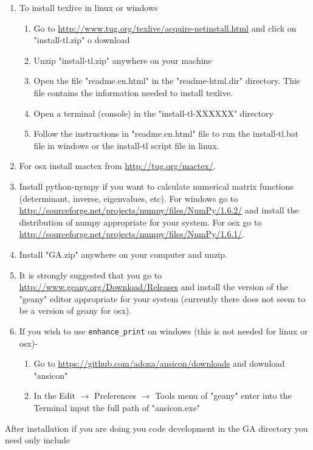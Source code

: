 \documentclass[10pt]{article}
\newcommand{\T}[1]{\texttt{#1}}
\begin{document}
\begin{enumerate}
    \item To install texlive in linux or windows
        \begin{enumerate}
        \item Go to \url{http://www.tug.org/texlive/acquire-netinstall.html} and click on "install-tl.zip" o download
        \item Unzip "install-tl.zip" anywhere on your machine
        \item Open the file "readme.en.html" in the "readme-html.dir" directory.  This file contains the information needed to install texlive.
        \item Open a terminal (console) in the "install-tl-XXXXXX" directory
        \item Follow the instructions in "readme.en.html" file to run the install-tl.bat file in windows or the install-tl script file in linux.
        \end{enumerate}
    \item For osx install mactex from \url{http://tug.org/mactex/}.
    \item Install python-nympy if you want to calculate numerical matrix functions (determinant, inverse, eigenvalues, etc). For windows go to
          \url{http://sourceforge.net/projects/numpy/files/NumPy/1.6.2/} and install the distribution of numpy appropriate for your system. For
          osx go to \url{http://sourceforge.net/projects/numpy/files/NumPy/1.6.1/}.
    \item Install "GA.zip" anywhere on your computer and unzip.
    \item It is strongly suggested that you go to \url{http://www.geany.org/Download/Releases} and install the version of the "geany" 
          editor appropriate for your system (currently there does not seem to be a version of geany for osx).
    \item If you wish to use \T{enhance\_print} on windows (this is not needed for linux or osx)-
        \begin{enumerate}
        \item Go to \url{https://github.com/adoxa/ansicon/downloads} and download "ansicon"
        \item In the Edit $\rightarrow$ Preferences $\rightarrow$ Tools menu of "geany" enter into the Terminal input the full path of "ansicon.exe"
	    \end{enumerate}
	\end{enumerate}

After installation if you are doing you code development in the GA directory you need only include
\end{document}

